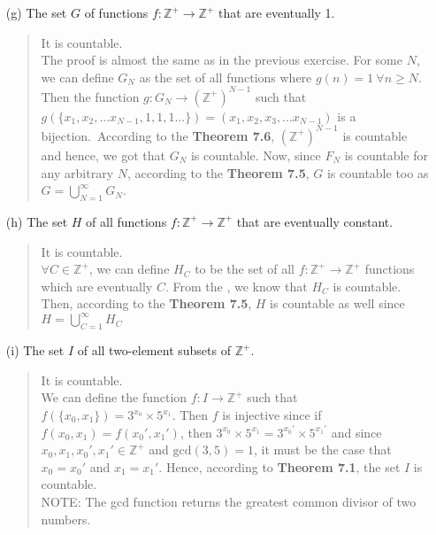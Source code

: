 \documentclass[12pt, a4paper]{article}
\newcommand{\pints}{\mathbb{Z}^+} %
\newcommand\und[1]{\underline{\smash{#1}}}
\newcommand{\rarr}{\rightarrow}
\begin{document}
\begin{itemize}
\begin{itemize}
\item[(g)]
The set $G$ of functions $f : \pints \rarr \pints$ that are eventually 1.
\begin{quote}
It is countable.\\
The proof is almost the same as in the previous exercise.
For some $N$, we can define $G_N$ as the set of all functions where $g(n) = 1 \ \forall n \geq N$.
Then the function $g : G_N \rarr (\pints)^{N - 1}$ such that\\
$g(\{x_1, x_2, ... x_{N-1}, 1, 1, 1 ...\}) = (x_1, x_2, x_3, ... x_{N - 1})$
is a bijection.\ According to the \textbf{Theorem 7.6}, $(\pints)^{N - 1}$ is countable and hence, we got that $G_N$ is countable. Now, since $F_N$ is countable for any arbitrary $N$,
according to the \textbf{Theorem 7.5}, $G$ is countable too as $G = \bigcup_{N = 1}^{\infty}G_N$.
\end{quote}

\item[]

\item[(h)]
The set $H$ of all functions $f : \pints \rarr \pints$ that are eventually constant.
\begin{quote}
It is countable.\\
$\forall C \in \pints$, we can define $H_C$ to be the set of all $f : \pints \rarr \pints$
functions which are eventually $C$. From the \und{\textbf{exercise (f)}}, we know that $H_C$
is countable. Then, according to the \textbf{Theorem 7.5}, $H$ is countable as well
since $H = \bigcup_{C = 1}^{\infty}H_C$
\end{quote}

\item[]

\item[(i)]
The set $I$ of all two-element subsets of $\pints$.
\begin{quote}
It is countable.\\
We can define the function $f : I \rarr \pints$
such that $f(\{x_0, x_1\}) = 3^{x_0} \times 5^{x_1}$.
Then $f$ is injective since if $f(x_0, x_1) = f(x_0\prime, x_1\prime)$,
then $3^{x_0} \times 5^{x_1} = 3^{x_0\prime} \times 5^{x_1\prime}$ and
since $x_0, x_1, x_0\prime, x_1\prime \in \pints$ and $\mbox{gcd}(3, 5) = 1$,
it must be the case that $x_0 = x_0\prime$ and $x_1 = x_1\prime$.
Hence, according to \textbf{Theorem 7.1}, the set $I$ is countable.\\
\vspace{0.25cm}
NOTE: The gcd function returns the greatest common divisor of two numbers.
\end{quote}


\end{itemize}
\end{itemize}
\end{document}
